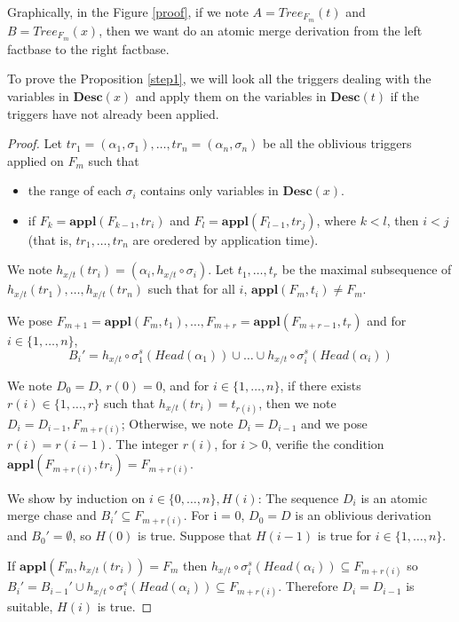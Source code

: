 \documentclass{article}
\theoremstyle{definition}
\theoremstyle{remark}
\newcommand{\Appl}{\textbf{appl}}
\newcommand{\Tree}{\textit{Tree}}
\newcommand{\des}{\textbf{Desc}}
\begin{document}
Graphically, in the Figure \ref{proof}, if we note $A=\Tree_{F_m}(t)$ and $B=\Tree_{F_m}(x)$, then we want do an atomic merge derivation from the left factbase to the right factbase.


To prove the Proposition \ref{step1}, we will look all the triggers dealing with the variables in $\des(x)$ and apply them on the variables in $\des(t)$ if the triggers have not already been applied.

\begin{proof}
Let $tr_1 = (\alpha_1,\sigma_1),\ldots, tr_n =(\alpha_n,\sigma_n)$ be all the oblivious triggers applied on $F_m$ such that
\begin{itemize}
\item the range of each $\sigma_i$ contains only variables in $\des(x)$.
\item if $F_k = \Appl(F_{k-1},tr_i)$ and $F_l = \Appl(F_{l-1},tr_j)$, where $k<l$, then $i<j$ (that is, $tr_1,\ldots,tr_n$ are oredered by application time).
\end{itemize} 
We note $h_{x/t}(tr_i)=(\alpha_i,h_{x/t} \circ \sigma_i)$. Let $t_1,\ldots,t_r$ be the maximal subsequence of  $h_{x/t}(tr_1),\ldots,h_{x/t}(tr_n)$ such that for all $i$, $\Appl(F_{m},t_i) \neq F_{m}$.


We pose $F_{m+1} = \Appl(F_m,t_1),\ldots, F_{m+r} = \Appl(F_{m+r-1},t_r)$ and for $i \in \{1,\ldots,n\}$, $$B_i' = {h_{x/t} \circ \sigma_1^s}(Head(\alpha_1)) \cup \ldots \cup {h_{x/t} \circ \sigma^s_i}(Head(\alpha_{i}))$$

We note $D_0 = D$, $r(0) = 0$, and for $i \in \{1,\ldots,n\}$, if there exists $r(i) \in \{1,\ldots,r\}$ such that $h_{x/t}(tr_i) = t_{r(i)}$, then we note $D_i = D_{i-1},F_{m+r(i)}$; Otherwise, we note $D_i = D_{i-1}$ and we pose $r(i) = r(i-1)$. The integer $r(i)$, for $i >0$, verifie the condition $\Appl(F_{m+r(i)},tr_i) =  F_{m+r(i)}$.

We show by induction on $i \in \{0,\ldots, n\},H(i)$: The sequence $D_i$ is an atomic merge chase and $B_i' \subseteq F_{m+r(i)}$. For i = 0, $D_0 = D$ is an oblivious derivation and $B_0' = \emptyset$, so $H(0)$ is true. Suppose that $H(i-1)$ is true for $i \in \{1,\ldots,n\}$.

If $\Appl(F_{m},h_{x/t}(tr_{i})) = F_{m}$ then $h_{x/t} \circ \sigma_i^s(Head(\alpha_i)) \subseteq F_{m+r(i)}$ so $B_i' = B_{i-1}' \cup h_{x/t} \circ \sigma_i^s(Head(\alpha_i)) 	\subseteq F_{m+r(i)}$. Therefore $D_i = D_{i-1}$ is suitable, $H(i)$ is true.


\end{proof}
\end{document}
